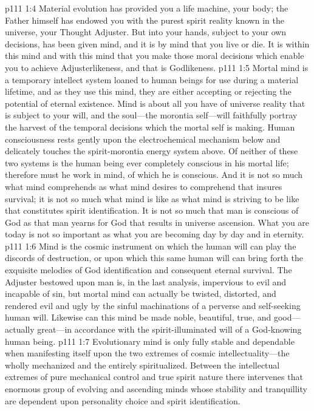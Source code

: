 \pc \vs p111 1:4 Material evolution has provided you a life machine, your body; the Father himself has endowed you with the purest spirit reality known in the universe, your Thought Adjuster. But into your hands, subject to your own decisions, has been given mind, and it is by mind that you live or die. It is within this mind and with this mind that you make those moral decisions which enable you to achieve Adjusterlikeness, and that is Godlikeness.
\vs p111 1:5 Mortal mind is a temporary intellect system loaned to human beings for use during a material lifetime, and as they use this mind, they are either accepting or rejecting the potential of eternal existence. Mind is about all you have of universe reality that is subject to your will, and the soul---the morontia self---will faithfully portray the harvest of the temporal decisions which the mortal self is making. Human consciousness rests gently upon the electrochemical mechanism below and delicately touches the spirit\hyp{}morontia energy system above. Of neither of these two systems is the human being ever completely conscious in his mortal life; therefore must he work in mind, of which he is conscious. And it is not so much what mind comprehends as what mind desires to comprehend that insures survival; it is not so much what mind is like as what mind is striving to be like that constitutes spirit identification. It is not so much that man is conscious of God as that man yearns for God that results in universe ascension. What you are today is not so important as what you are becoming day by day and in eternity.
\vs p111 1:6 Mind is the cosmic instrument on which the human will can play the discords of destruction, or upon which this same human will can bring forth the exquisite melodies of God identification and consequent eternal survival. The Adjuster bestowed upon man is, in the last analysis, impervious to evil and incapable of sin, but mortal mind can actually be twisted, distorted, and rendered evil and ugly by the sinful machinations of a perverse and self\hyp{}seeking human will. Likewise can this mind be made noble, beautiful, true, and good---actually great---in accordance with the spirit\hyp{}illuminated will of a God\hyp{}knowing human being.
\pc \vs p111 1:7 Evolutionary mind is only fully stable and dependable when manifesting itself upon the two extremes of cosmic intellectuality---the wholly mechanized and the entirely spiritualized. Between the intellectual extremes of pure mechanical control and true spirit nature there intervenes that enormous group of evolving and ascending minds whose stability and tranquillity are dependent upon personality choice and spirit identification.
